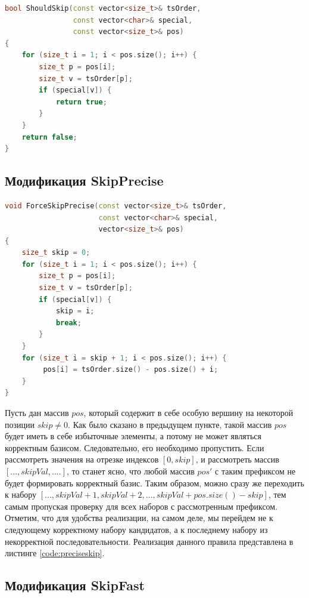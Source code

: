\documentclass[12pt,a4paper,oneside,openany]{article}
\theoremstyle{definition}
\theoremstyle{lemma}
\theoremstyle{remark}
\begin{document}
\begin{lstlisting}[language=C++, caption=Проверка множества на наличие доминируемых вершин, label=code:shouldskip]
bool ShouldSkip(const vector<size_t>& tsOrder,
                const vector<char>& special,
                const vector<size_t>& pos)
{
    for (size_t i = 1; i < pos.size(); i++) {
        size_t p = pos[i];
        size_t v = tsOrder[p];
        if (special[v]) {
            return true;
        }
    }
    return false;
}
\end{lstlisting}

\subsection{Модификация SkipPrecise}\label{subsec:preciseskip}

\begin{lstlisting}[language=C++, caption=Пропуск сразу нескольких наборов кандидатов без ложно-отрицательных результатов, label=code:preciseskip]
void ForceSkipPrecise(const vector<size_t>& tsOrder,
                      const vector<char>& special,
                      vector<size_t>& pos)
{
    size_t skip = 0;
    for (size_t i = 1; i < pos.size(); i++) {
        size_t p = pos[i];
        size_t v = tsOrder[p];
        if (special[v]) {
            skip = i;
            break;
        }
    }
    for (size_t i = skip + 1; i < pos.size(); i++) {
         pos[i] = tsOrder.size() - pos.size() + i;
    }
}
\end{lstlisting}

Пусть дан массив $pos$, который содержит в себе особую вершину на некоторой позиции $skip \neq 0$.
Как было сказано в предыдущем пункте, такой массив $pos$ будет иметь в себе избыточные элементы, а
потому не может являться корректным базисом. Следовательно, его необходимо пропустить.
Если рассмотреть значения на отрезке индексов $[0, skip]$, и рассмотреть массив $[..., skipVal, ....]$, то станет ясно, что любой массив $pos'$
с таким префиксом не будет формировать корректный базис. Таким образом, можно сразу же переходить
к набору $[..., skipVal + 1, skipVal + 2, ..., skipVal + pos.size() - skip]$,
тем самым пропуская проверку для всех наборов с рассмотренным префиксом.
Отметим, что для удобства реализации, на самом деле, мы перейдем не к следующему корректному набору
кандидатов, а к последнему набору из некорректной последовательности.
Реализация данного правила представлена в листинге \ref{code:preciseskip}.

\subsection{Модификация SkipFast}\label{subsec:fastskip}
\end{document}
